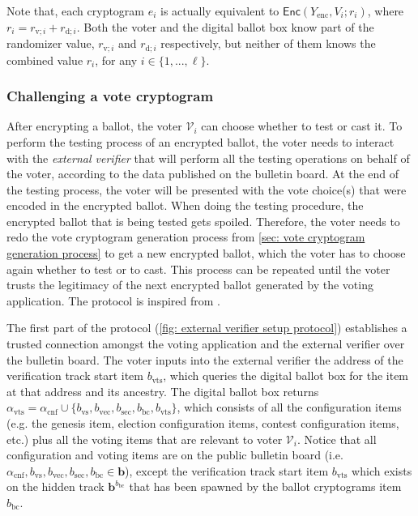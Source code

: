 Note that, each cryptogram $e_i$ is actually equivalent to $\mathsf{Enc}(Y_\mathrm{enc}, V_i; r_i)$, where $r_i = r_{\mathrm{v}; i} + r_{\mathrm{d}; i}$. Both the voter and the digital ballot box know part of the randomizer value, $r_{\mathrm{v}; i}$ and $r_{\mathrm{d}; i}$ respectively, but neither of them knows the combined value $r_i$, for any $i \in \{ 1, ..., \ell \}$.


\clearpage
\subsubsection{Challenging a vote cryptogram} \label{sec: challenging a vote cryptogram}
After encrypting a ballot, the voter $\mathcal{V}_i$ can choose whether to test or cast it. To perform the testing process of an encrypted ballot, the voter needs to interact with the \textit{external verifier} that will perform all the testing operations on behalf of the voter, according to the data published on the bulletin board. At the end of the testing process, the voter will be presented with the vote choice(s) that were encoded in the encrypted ballot. When doing the testing procedure, the encrypted ballot that is being tested gets spoiled. Therefore, the voter needs to redo the vote cryptogram generation process from \cref{sec: vote cryptogram generation process} to get a new encrypted ballot, which the voter has to choose again whether to test or to cast. This process can be repeated until the voter trusts the legitimacy of the next encrypted ballot generated by the voting application. The protocol is inspired from \cite{Benaloh06}.

The first part of the protocol (\cref{fig: external verifier setup protocol}) establishes a trusted connection amongst the voting application and the external verifier over the bulletin board. The voter inputs into the external verifier the address of the verification track start item $b_\mathrm{vts}$, which queries the digital ballot box for the item at that address and its ancestry. The digital ballot box returns $\alpha_\mathrm{vts} = \alpha_\mathrm{cnf} \cup \{ b_\mathrm{vs}, b_\mathrm{vec}, b_\mathrm{sec}, b_\mathrm{bc}, b_\mathrm{vts} \}$, which consists of all the configuration items (e.g. the genesis item, election configuration items, contest configuration items, etc.) plus all the voting items that are relevant to voter $\mathcal{V}_i$. Notice that all configuration and voting items are on the public bulletin board (i.e. $\alpha_\mathrm{cnf}, b_\mathrm{vs}, b_\mathrm{vec}, b_\mathrm{sec}, b_\mathrm{bc} \in \boldsymbol{b}$), except the verification track start item $b_\mathrm{vts}$ which exists on the hidden track $\boldsymbol{b}^{b_\mathrm{bc}}$ that has been spawned by the ballot cryptograms item $b_\mathrm{bc}$.

